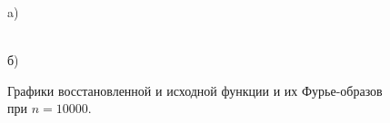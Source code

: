 \documentclass[a5paper, 10pt]{article}
\theoremstyle{definition}
\theoremstyle{plain}
\theoremstyle{remark}
\begin{document}
\begin{figure}[h!]
\begin{minipage}[h!]{0.5\linewidth}
 a) \\
\end{minipage}
\hfill
\begin{minipage}[h!]{0.5\linewidth}
 \\б)
\end{minipage}
\caption{ Графики восстановленной и исходной функции и их Фурье-образов при $n=10000$.}
\end{figure}
\end{document}
